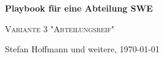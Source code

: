 \begin{titlepage}
	\centering
	\vspace*{5cm}
	{\huge\bfseries Playbook für eine Abteilung SWE\par}
	{\scshape\LARGE Variante 3 "Abteilungsreif"\par}
	\vspace{2cm}
	{\Large\itshape \par}
	\vfill
	{\large Stefan Hoffmann und weitere, \today\par}
\end{titlepage}
